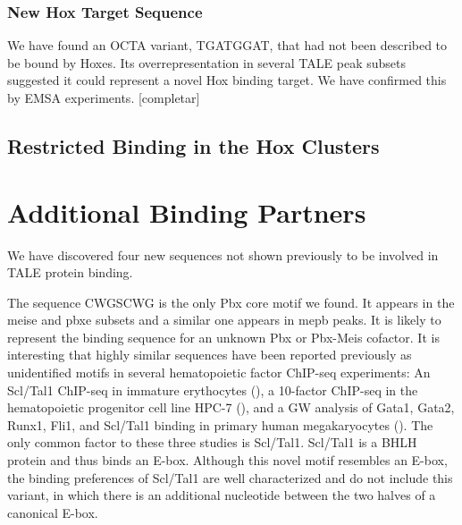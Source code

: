 \subsubsection{New Hox Target Sequence}

We have found an \ac{OCTA} variant, TGATGGAT, that had not been described to be bound by Hoxes. Its overrepresentation in several \ac{TALE} peak subsets suggested it could represent a novel Hox binding target. We have confirmed this by \ac{EMSA} experiments. [completar]

\subsection{Restricted Binding in the Hox Clusters}



\section{Additional Binding Partners}

We have discovered four new sequences not shown previously to be involved in \ac{TALE} protein binding. 

The sequence CWGSCWG is the only Pbx core motif we found. It appears in the \ac{meise} and \ac{pbxe} subsets and a similar one appears in \ac{mepb} peaks. It is likely to represent the binding sequence for an unknown Pbx or Pbx-Meis cofactor. It is interesting that highly similar sequences have been reported previously as unidentified motifs in several hematopoietic factor ChIP-seq experiments: An Scl/Tal1 ChIP-seq in immature erythocytes (\cite{Kassouf2010}), a 10-factor ChIP-seq in the hematopoietic progenitor cell
line HPC-7 (\cite{Wilson2010}), and a \ac{GW} analysis of Gata1, Gata2, Runx1, Fli1, and Scl/Tal1 binding in primary human megakaryocytes (\cite{Tijssen2011}). The only common factor to these three studies is Scl/Tal1. Scl/Tal1 is a \ac{BHLH} protein and thus binds an E-box. Although this novel motif resembles an E-box, the binding preferences of Scl/Tal1 are well characterized and do not include this variant, in which there is an additional nucleotide between the two halves of a canonical E-box. %

